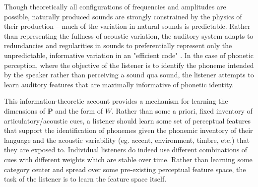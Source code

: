 Though theoretically all configurations of frequencies and amplitudes are possible, naturally produced sounds are strongly constrained by the physics of their production -- much of the variation in natural sounds is predictable. Rather than representing the fullness of acoustic variation, the auditory system adapts to redundancies and regularities in sounds to preferentially represent only the unpredictable, informative variation in an "efficient code" \citep{smithEfficientAuditoryCoding2006a,Geffen2011}. In the case of phonetic perception, where the objective of the listener is to identify the phoneme intended by the speaker rather than perceiving a sound qua sound, the listener attempts to learn auditory features that are maximally informative of phonetic identity\citep{kiefteAbsorptionReliableSpectral2008,liuOptimalFeaturesAuditory2019,kluenderLongstandingProblemsSpeech2019a,kluenderPerceptionVowelSounds2013}.

This information-theoretic account provides a mechanism for learning the dimensions of $\mathbf{P}$ and the form of $W$. Rather than some a priori, fixed inventory of articulatory/acoustic cues, a listener should learn some set of perceptual features that support the identification of phonemes given the phonemic inventory of their language and the acoustic variability (eg. accent, environment, timbre, etc.) that they are exposed to. Individual listeners do indeed use different combinations of cues with different weights\citep{iversonInfluencesPhoneticIdentification1996} which are stable over time\citep{souzaReliabilityRepeatabilitySpeech2018}. Rather than learning some category center and spread over some pre-existing perceptual feature space, the task of the listener is to learn the feature space itself. 

